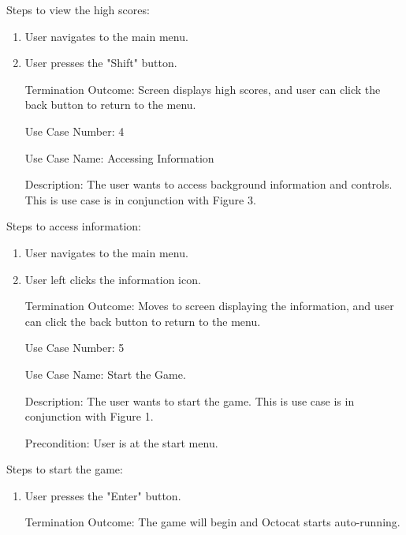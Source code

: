 \documentclass[10pt,conference,onecolumn,compsoc]{IEEEtran}
\begin{document}
Steps to view the high scores:

\begin{enumerate}
\item User navigates to the main menu.
\item User presses the "Shift" button.
\item[Termination Outcome:] Screen displays high scores, and user can click the back button to return to the menu.\\
\end{enumerate}

\begin{itemize}
\item[Use Case Number:] 4
\item[Use Case Name:] Accessing Information
\item[Description:] The user wants to access background information and controls. This is use case is in conjunction with Figure 3.
\end{itemize}

Steps to access information:

\begin{enumerate}
\item User navigates to the main menu.
\item User left clicks the information icon.
\item[Termination Outcome:] Moves to screen displaying the information, and user can click the back button to return to the menu.\\
\end{enumerate}

\begin{itemize}
\item[Use Case Number:] 5
\item[Use Case Name:] Start the Game.
\item[Description:] The user wants to start the game. This is use case is in conjunction with Figure 1.
\item[Precondition:] User is at the start menu.
\end{itemize}

Steps to start the game:

\begin{enumerate}
\item User presses the "Enter" button.
\item[Termination Outcome:] The game will begin and Octocat starts auto-running.\\
\end{enumerate}
\end{document}
